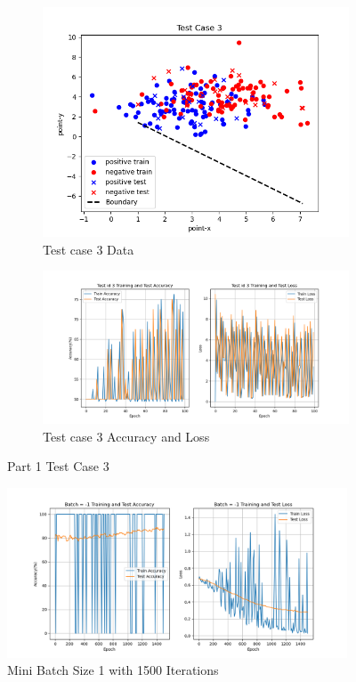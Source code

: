 \documentclass{article}
\begin{document}
\begin{appendix}
\begin{figure}[!ht]
  \centering
  \begin{subfigure}[b]{0.5\textwidth}
    \includegraphics[width=\textwidth]{img/Part1/test3_data.png}
    \caption{Test case 3 Data}
  \end{subfigure}
  \begin{subfigure}[b]{1\textwidth}
    \includegraphics[width=\textwidth]{img/Part1/test3_curve.png}
    \caption{Test case 3 Accuracy and Loss}
  \end{subfigure}
  \caption{Part 1 Test Case 3}
  \label{fig:p1test3}
\end{figure}

\begin{figure}[!htbp]
    \centering
    \includegraphics[width=0.9\textwidth]{img/Part2/curve_batch_-1.png}
    \caption{Mini Batch Size 1 with 1500 Iterations}
    \label{fig:p2batch-1}
\end{figure}



\end{appendix}
\end{document}
